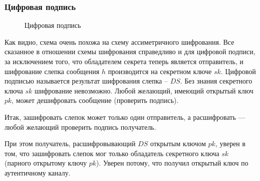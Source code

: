 \begin{frame}
\frametitle{Цифровая подпись}
\begin{figure}
    \begin{center}
    \end{center}
    \caption{Цифровая подпись}\label{pict:signature}
\end{figure} 
\end{frame}

Как видно, схема очень похожа на схему ассиметричного шифрования. Все сказанное в отношении схемы шифрования справедливо и для цифровой подписи, за исключением того, что обладателем секрета теперь является отправитель, и шифрование слепка сообщения $h$ производится на секретном ключе $sk$. Цифровой подписью называется результат шифрования слепка – $DS$. Без знания секретного ключа $sk$ шифрование невозможно. Любой желающий, имеющий открытый ключ $pk$, может дешифровать сообщение (проверить подпись).

Итак, зашифровать слепок может только один отправитель, а расшифровать --- любой желающий проверить подпись получатель.

При этом получатель, расшифровывающий $DS$ открытым ключом $pk$, уверен в том, что зашифровать слепок мог только обладатель секретного ключа $sk$ (парного открытому ключу $pk$). Уверен потому, что получил открытый ключ по аутентичному каналу.

